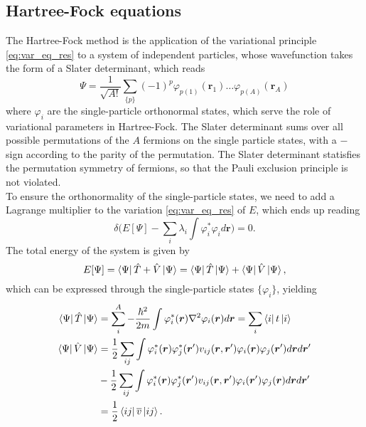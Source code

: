 \subsection{Hartree-Fock equations}
The Hartree-Fock method is the application of the variational principle \eqref{eq:var_eq_res} to a system of independent particles, whose wavefunction takes the form of a Slater determinant, which reads
\begin{equation}
    \label{eq:slater_formula}
    \Psi = \frac{1}{\sqrt {A!}} \sum_{\{p\}} (-1)^{p}  \varphi_{p(1)}(\bm r_1)\ldots \varphi_{p(A)}(\bm r_A)
\end{equation}
where $\varphi_i$ are the single-particle orthonormal states, which serve the role of variational parameters in Hartree-Fock.
The Slater determinant sums over all possible permutations of the $A$ fermions on the single particle states, with a $-$ sign according to the parity of the permutation.
The Slater determinant statisfies the permutation symmetry of fermions, so that the Pauli exclusion principle is not violated.
\\To ensure the orthonormality of the single-particle states, we need to add a Lagrange multiplier to the variation \eqref{eq:var_eq_res} of $E$, which ends up reading
\begin{equation}
    \label{eq:fdv_hf}
\delta \bigg(E[\Psi] - \sum_i\lambda_i \int \varphi_i^*\varphi_i d\bm r \bigg) = 0.
\end{equation}
The total energy of the system is given by
\begin{equation}
    \label{eq:total_energy_HF}
    E[\Psi] = \bra{\Psi} \hat T + \hat V\ket \Psi = \bra{\Psi}\hat T \ket{\Psi}+ \bra{\Psi}\hat V \ket{\Psi},
\end{equation} 
which can be expressed through the single-particle states $\{\varphi_i\}$, yielding
\begin{align}
    \label{eq:exp_T_V}
    \bra\Psi\hat T\ket \Psi &= \sum_i^A -\frac{\hbar^2}{2m}\int \varphi_i^*(\bm r) \nabla^2 \varphi_i(\bm r) d\bm r=\sum_i \bra{i}t\ket{i}\\
    \bra\Psi\hat V\ket \Psi &= \frac 1 2 \sum_{ij}\int\varphi_i^*(\bm r) \varphi_j^*(\bm r') v_{ij}(\bm r, \bm r')\varphi_i(\bm r)\varphi_j(\bm r') d\bm r d\bm r'\\
    &- \frac 1 2 \sum_{ij}\int \varphi_i^*(\bm r) \varphi_j^*(\bm r') v_{ij}(\bm r, \bm r')\varphi_i(\bm r')\varphi_j(\bm r) d\bm r d\bm r' \\&= \frac 1 2 \bra{ij}\overline v \ket{ij}.
\end{align}
